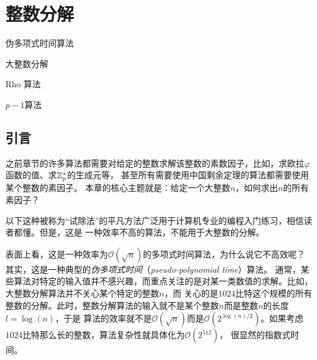 
\chapter{整数分解}
\label{chap:factoring} 
\begin{introduction}
  \item 伪多项式时间算法
  \item 大整数分解
  \item Rho 算法
  \item  $p - 1$算法
\end{introduction}

\section{引言}
\label{sec:fac_intr}
之前章节的许多算法都需要对给定的整数求解该整数的素数因子，比如，求欧拉$\varphi$函数的值、求${\mathbb Z}_p^*$的生成元等，
甚至所有需要使用中国剩余定理的算法都需要使用某个整数的素因子。
本章的核心主题就是：给定一个大整数$n$，如何求出$n$的所有素因子？

以下这种被称为“试除法”的平凡方法广泛用于计算机专业的编程入门练习，相信读者都懂。但是，这是
一种效率不高的算法，不能用于大整数的分解。
\begin{center}
	
\end{center}

表面上看，这是一种效率为$\mathcal{O}(\sqrt{n})$的多项式时间算法，为什么说它不高效呢？
其实，这是一种典型的\emph{伪多项式时间}（\emph{pseudo-polynomial time}）算法。
通常，某些算法对特定的输入值并不感兴趣，而重点关注的是对某一类数值的求解。比如，大整数分解算法并不关心某个特定的整数$n$，而
关心的是$1024$比特这个规模的所有整数的分解。此时，整数分解算法的输入就不是某个整数$n$而是整数$n$的长度$l = \log(n)$，于是
算法的效率就不是$\mathcal{O}(\sqrt{n})$而是$\mathcal{O}(2^{\log(n)/2})$。如果考虑$1024$比特那么长的整数，算法复杂性就具体化为$\mathcal{O}(2^{512})$，
很显然的指数式时间。

